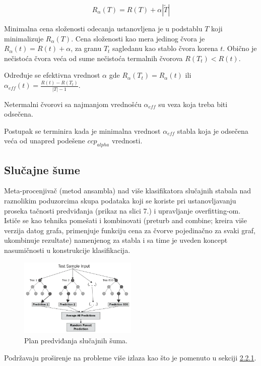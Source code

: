 \documentclass[fontsize=12bp, paper=a4]{scrarticle}
\begin{document}
$$R_\alpha(T) = R(T) + \alpha|\widetilde{T}|$$

Minimalna cena složenosti odecanja ustanovljena je u podstablu $T$ koji minimalizuje $R_\alpha(T)$. 
Cena složenosti kao mera jedinog čvora je $R_\alpha(t)=R(t)+\alpha$, za granu $T_t$ sagledanu kao stablo čvora korena $t$. Obično je nečistoća čvora veća od sume nečistoća termalnih čvorova $R(T_t)<R(t)$.

Određuje se efektivna vrednost $\alpha$ gde $R_\alpha(T_t)=R_\alpha(t)$ ili $\alpha_{eff}(t)=\frac{R(t)-R(T_t)}{|T|-1}$.


Netermalni čvorovi sa najmanjom vrednošću $\alpha_{eff}$ su veza koja treba biti odsečena.


Postupak se terminira kada je minimalna vrednost $\alpha_{eff}$ stabla koja je odsečena veća od unapred podešene $ccp_{alpha}$ vrednosti\cite{ccpalpha}.

\newpage

\subsection{Slučajne šume}
Meta-procenjivač (metod ansambla) nad više klasifikatora slučajnih stabala nad raznolikim poduzorcima skupa podataka koji se koriste pri ustanovljavanju proseka tačnosti predviđanja (prikaz na slici 7.) i upravljanje overfitting-om.\cite{ensamblerf}\cite{rf} Ističe se kao tehnika pomešati i kombinovati (preturb and combine; kreira više verzija datog grafa, primenjuje funkciju cena za čvorve pojedinačno za svaki graf, ukombinuje rezultate\cite{pnc}) namenjenog za stabla i sa time je uveden koncept nasumičnosti u konstrukcije klasifikacija. 

\begin{figure}[h!]
    \centering
    \includegraphics[width=0.5\textwidth]{image-6.png}
    \caption{Plan predviđanja slučajnih šuma.}
\end{figure}

Podržavaju proširenje na probleme više izlaza kao što je pomenuto u sekciji \hyperref[sec:mop]{2.2.1}.
\end{document}
